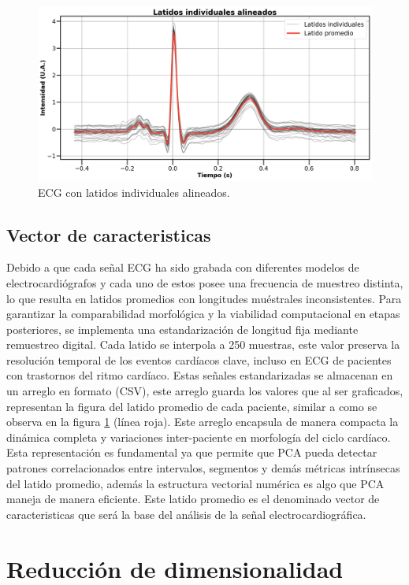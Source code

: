 \documentclass[12pt,letterpaper,oneside,openright]{book}
\begin{document}
\begin{figure}[h]
	\centering
	\includegraphics[width=0.85\linewidth]{Sem_1/figuras/ecg_latidos_alineados.png}
	\caption{ECG con latidos individuales alineados.}
	\label{fig:latidos_alineados}
\end{figure}

\subsection{Vector de caracteristicas} 

Debido a que cada señal ECG ha sido grabada con diferentes modelos de electrocardiógrafos y cada uno de estos posee una frecuencia de muestreo distinta, lo que resulta en latidos promedios con longitudes muéstrales inconsistentes. Para garantizar la comparabilidad morfológica y la viabilidad computacional en etapas posteriores, se implementa una estandarización de longitud fija mediante remuestreo digital. Cada latido se interpola a 250 muestras, este valor preserva la resolución temporal de los eventos cardíacos clave, incluso en ECG de pacientes con trastornos del ritmo cardíaco. Estas señales estandarizadas se almacenan en un arreglo en formato (CSV), este arreglo guarda los valores que al ser graficados, representan la figura del latido promedio de cada paciente, similar a como se observa en la figura \ref{fig:latidos_alineados} (línea roja). 
Este arreglo encapsula de manera compacta la dinámica completa y variaciones inter-paciente en morfología del ciclo cardíaco. Esta representación es fundamental ya que permite que PCA pueda detectar patrones correlacionados entre intervalos, segmentos y demás métricas intrínsecas del latido promedio, además la estructura vectorial numérica es algo que PCA maneja de manera eficiente. Este latido promedio es el denominado vector de caracteristicas que será la base del análisis de la señal electrocardiográfica. 

\section{Reducción de dimensionalidad}
\end{document}

